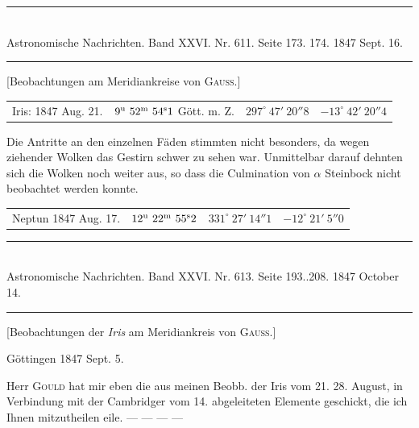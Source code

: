 \clearpage
{}
\begin{center}
\rule{0.55\linewidth}{0.4pt}\\[2pt]
Astronomische Nachrichten. Band XXVI. Nr. 611. Seite 173. 174. 1847 Sept. 16.\\[2pt]
\rule{0.55\linewidth}{0.4pt}
\end{center}
\begin{center}[Beobachtungen am Meridiankreise von \textsc{Gauss}.]\end{center}

\begin{center}
\small
\setlength{\tabcolsep}{3pt}
\begin{tabular}{lrll}
Iris: 1847 Aug. 21. & $9^{\rm u}\ 52^{\rm m}\ 54^{\rm s}1$ Gött. m. Z. & $297^\circ\ 47'\ 20''8$ & $-13^\circ\ 42'\ 20''4$ \\
\end{tabular}
\end{center}

Die Antritte an den einzelnen Fäden stimmten nicht besonders, da wegen ziehender Wolken das Gestirn schwer zu sehen war. Unmittelbar darauf dehnten sich die Wolken noch weiter aus, so dass die Culmination von $\alpha$ Steinbock nicht beobachtet werden konnte.

\begin{center}
\small
\setlength{\tabcolsep}{4pt}
\begin{tabular}{lrrr}
Neptun 1847 Aug. 17. & $12^{\rm u}\ 22^{\rm m}\ 55^{\rm s}2$ & $331^\circ\ 27'\ 14''1$ & $-12^\circ\ 21'\ 5''0$ \\
\end{tabular}
\end{center}

\clearpage
\hypertarget{native-479-lower}{}
\begin{center}
\rule{0.55\linewidth}{0.4pt}\\[2pt]
Astronomische Nachrichten. Band XXVI. Nr. 613. Seite 193..208. 1847 October 14.\\[2pt]
\rule{0.55\linewidth}{0.4pt}
\end{center}
\begin{center}[Beobachtungen der \emph{Iris} am Meridiankreis von \textsc{Gauss}.]\end{center}
\begin{flushright}Göttingen 1847 Sept. 5.\end{flushright}

Herr \textsc{Gould} hat mir eben die aus meinen Beobb. der Iris vom 21. 28. August, in Verbindung mit der Cambridger vom 14. abgeleiteten Elemente geschickt, die ich Ihnen mitzutheilen eile. --- --- --- ---

